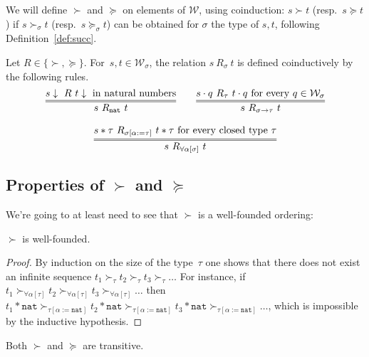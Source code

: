 \documentclass[runningheads,a4paper]{llncs}
\newcommand{\World}{\mathcal{W}}
\newcommand{\app}[2]{#1 \cdot #2}
\newcommand{\tapp}[2]{#1 * #2}
\newcommand{\subst}[2]{#1:=#2}
\newcommand{\nat}{\mathtt{nat}}
\newcommand{\da}{\downarrow}
\begin{document}
We will define $\succ$ and $\succeq$ on elements of $\World$, using
coinduction: $s \succ t$ (resp.\ $s \succeq t$) if $s \succ_\sigma t$
(resp.\ $s \succeq_\sigma t$) can be obtained for $\sigma$ the type of
$s,t$, following Definition~\ref{def:succ}.

\begin{definition}\label{def:succ}
  Let $R \in \{ \succ,\succeq \}$. For~$s,t \in \World_\sigma$, the
  relation $s\ R_{\sigma}\ t$ is defined coinductively by the
  following rules.
  \[
    \begin{array}{c}
    \infer={s\ R_\nat\ t}{s\da\ R\ t\da \text{ in natural
        numbers}}\quad\quad
    \infer={s\ R_{\sigma\to\tau}\ t}{\app{s}{q}\ R_{\tau}\ \app{t}{q}
      \text{ for every } q \in \World_\sigma} \\ \\
    \infer={s\ R_{\forall\alpha[\sigma]}\ t}{\tapp{s}{\tau}\ R_{\sigma[\subst{\alpha}{\tau}]}\ \tapp{t}{\tau}
      \text{ for every closed type } \tau}
    \end{array}
  \]
\end{definition}

\subsection{Properties of $\succ$ and $\succeq$}

We're going to at least need to see that $\succ$ is a well-founded ordering:

\begin{lemma}
$\succ$ is well-founded.
\end{lemma}

\begin{proof}
  By induction on the size of the type~$\tau$ one shows that there does
  not exist an infinite sequence
  $t_1 \succ_\tau t_2 \succ_\tau t_3 \succ_\tau \ldots$ For instance,
  if
  $t_1 \succ_{\forall\alpha[\tau]} t_2 \succ_{\forall\alpha[\tau]} t_3
  \succ_{\forall\alpha[\tau]} \ldots$ then
  $\tapp{t_1}{\nat} \succ_{\tau[\subst{\alpha}{\nat}]}
  \tapp{t_2}{\nat} \succ_{\tau[\subst{\alpha}{\nat}]} \tapp{t_3}{\nat}
  \succ_{\tau[\subst{\alpha}{\nat}]} \ldots$, which is impossible by
  the inductive hypothesis.
\end{proof}

\begin{lemma}
Both $\succ$ and $\succeq$ are transitive.
\end{lemma}
\end{document}
